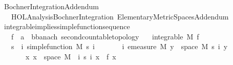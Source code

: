 %
\begin{isabellebody}%
%
%
\isadelimtheory
%
\endisadelimtheory
%
\isatagtheory
{}\isamarkupfalse%
\ Bochner{\isacharunderscore}{\kern0pt}Integration{\isacharunderscore}{\kern0pt}Addendum\isanewline
\ \ \ {\isachardoublequoteopen}HOL{\isacharminus}{\kern0pt}Analysis{\isachardot}{\kern0pt}Bochner{\isacharunderscore}{\kern0pt}Integration{\isachardoublequoteclose}\ Elementary{\isacharunderscore}{\kern0pt}Metric{\isacharunderscore}{\kern0pt}Spaces{\isacharunderscore}{\kern0pt}Addendum\isanewline
{}%
\endisatagtheory
{\isafoldtheory}%
%
\isadelimtheory
%
\endisadelimtheory
%
\isadelimdocument
%
\endisadelimdocument
%
\isatagdocument
%
\isamarkuptrue%
%
\endisatagdocument
{\isafolddocument}%
%
\isadelimdocument
%
\endisadelimdocument
{}\isamarkupfalse%
\ integrable{\isacharunderscore}{\kern0pt}implies{\isacharunderscore}{\kern0pt}simple{\isacharunderscore}{\kern0pt}function{\isacharunderscore}{\kern0pt}sequence{\isacharcolon}{\kern0pt}\isanewline
\ \ \ f\ {\isacharcolon}{\kern0pt}{\isacharcolon}{\kern0pt}\ {\isachardoublequoteopen}{\isacharprime}{\kern0pt}a\ {\isasymRightarrow}\ {\isacharprime}{\kern0pt}b{\isacharcolon}{\kern0pt}{\isacharcolon}{\kern0pt}{\isacharbraceleft}{\kern0pt}banach{\isacharcomma}{\kern0pt}\ second{\isacharunderscore}{\kern0pt}countable{\isacharunderscore}{\kern0pt}topology{\isacharbraceright}{\kern0pt}{\isachardoublequoteclose}\isanewline
\ \ \ {\isachardoublequoteopen}integrable\ M\ f{\isachardoublequoteclose}\isanewline
\ \ \ s\ \ {\isachardoublequoteopen}{\isasymAnd}i{\isachardot}{\kern0pt}\ simple{\isacharunderscore}{\kern0pt}function\ M\ {\isacharparenleft}{\kern0pt}s\ i{\isacharparenright}{\kern0pt}{\isachardoublequoteclose}\isanewline
\ \ \ \ \ \ \ {\isachardoublequoteopen}{\isasymAnd}i{\isachardot}{\kern0pt}\ emeasure\ M\ {\isacharbraceleft}{\kern0pt}y\ {\isasymin}\ space\ M{\isachardot}{\kern0pt}\ s\ i\ y\ {\isasymnoteq}\ {}{\isacharbraceright}{\kern0pt}\ {\isasymnoteq}\ {\isasyminfinity}{\isachardoublequoteclose}\isanewline
\ \ \ \ \ \ \ {\isachardoublequoteopen}{\isasymAnd}x{\isachardot}{\kern0pt}\ x\ {\isasymin}\ space\ M\ {\isasymLongrightarrow}\ {\isacharparenleft}{\kern0pt}{\isasymlambda}i{\isachardot}{\kern0pt}\ s\ i\ x{\isacharparenright}{\kern0pt}\ {\isasymlonglonglongrightarrow}\ f\ x{\isachardoublequoteclose}\isanewline

\end{isabellebody}
